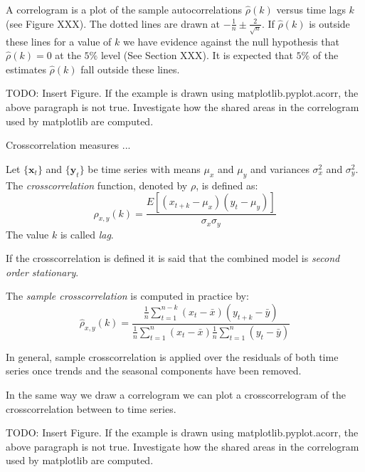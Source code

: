 A correlogram is a plot of the sample autocorrelations $\hat{\rho}(k)$ versus time lags $k$ (see Figure {\color{red} XXX}). The dotted lines are drawn at $-\frac{1}{n}\pm\frac{2}{\sqrt{n}}$. If $\hat{\rho}(k)$ is outside these lines for a value of $k$ we have evidence against the null hypothesis that $\hat{\rho}(k)=0$ at the $5\%$ level (See Section {\color{red} XXX}). It is expected that $5\%$ of the estimates $\hat{\rho}(k)$ fall outside these lines.

\begin{example}
{\color {red} TODO: Insert Figure. If the example is drawn using matplotlib.pyplot.acorr, the above paragraph is not true. Investigate how the shared areas in the correlogram used by matplotlib are computed.}
\end{example}

Crosscorrelation measures ...

\begin{definition}
Let $\{\mathbf{x}_t\}$ and $\{\mathbf{y}_t\}$ be time series with means $\mu_x$ and $\mu_y$ and variances $\sigma_x^2$ and $\sigma_y^2$. The \emph{crosscorrelation} function, denoted by $\rho$, is defined as:
\[
\rho_{x,y}(k) = \frac{E\left[\left(x_{t+k}-\mu_x\right)\left(y_t-\mu_y\right)\right]}{\sigma_x \sigma_y}
\]
The value $k$ is called \emph{lag}.
\end{definition}

If the crosscorrelation is defined it is said that the combined model is \emph{second order stationary}.

The \emph{sample crosscorrelation} is computed in practice by:
\[
\hat{\rho}_{x,y}(k) = \frac{ \frac{1}{n}\sum_{t=1}^{n-k}\left(x_{t}-\bar{x}\right)\left(y_{t+k}-\bar{y}\right) }{ \frac{1}{n}\sum_{t=1}^{n}\left(x_{t}-\bar{x}\right) \frac{1}{n}\sum_{t=1}^{n}\left(y_{t}-\bar{y}\right) }
\]

In general, sample crosscorrelation is applied over the residuals of both time series once trends and the seasonal components have been removed.

In the same way we draw a correlogram we can plot a crosscorrelogram of the crosscorrelation between to time series.

\begin{example}
{\color {red} TODO: Insert Figure. If the example is drawn using matplotlib.pyplot.acorr, the above paragraph is not true. Investigate how the shared areas in the correlogram used by matplotlib are computed.}
\end{example}

